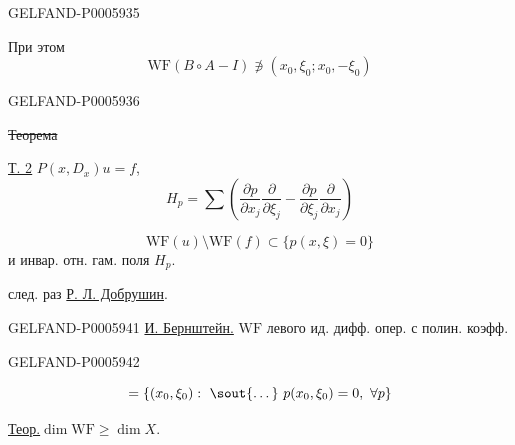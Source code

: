 \begin{GelfandAdjacentEvidence}{GELFAND-P000593}{5}


При этом
\[
\mathrm{WF}(B\circ A-I)\not\ni(x_0,\xi_0;x_0,-\xi_0)
\]
\end{GelfandAdjacentEvidence}
\begin{GelfandAdjacentEvidence}{GELFAND-P000593}{6}


\sout{Теорема}

\underline{\underline{Т. 2}} \(P(x,D_x)u=f\),
\[
H_p=\sum\left(
\frac{\partial p}{\partial x_j}\frac{\partial}{\partial\xi_j}
-\frac{\partial p}{\partial\xi_j}\frac{\partial}{\partial x_j}\right)
\]
\end{GelfandAdjacentEvidence}

\[
\mathrm{WF}(u)\setminus\mathrm{WF}(f)\subset\{p(x,\xi)=0\}
\]
и инвар. отн. гам. поля \(H_p\).

след. раз \underline{Р. Л. Добрушин}.


\begin{GelfandAdjacentEvidence}{GELFAND-P000594}{1}
\underline{И. Бернштейн.}\qquad
\(\mathrm{WF}\) левого ид. дифф. опер. с полин. коэфф.
\end{GelfandAdjacentEvidence}
\begin{GelfandAdjacentEvidence}{GELFAND-P000594}{2}

\[
=\{(x_0,\xi_0):\ \text{\sout{\textellipsis{}}}\ p(x_0,\xi_0)=0,\ \forall p\}
\]
\end{GelfandAdjacentEvidence}


\underline{Теор.}\quad \(\dim\mathrm{WF}\ge\dim X\).


